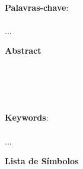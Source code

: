 \documentclass[a4paper, 12 pt]{article} %
\begin{document}
\blindtext 
%
\blindtext 
%
\blindtext 
%
\blindtext \\

\textbf{Palavras-chave}: \\ \\ ...

\clearpage


\begin{center}
    \large{\textbf{Abstract}}
\end{center}

\blindtext 
%
\blindtext 
%
\blindtext 
%
\blindtext \\
\\
\\
\\
\textbf{Keywords}:
\\
\\
...



\clearpage

\begin{center}
\listoffigures \newpage %
\end{center}

\begin{center}
\listoftables \newpage %
\end{center}

\begin{center}
    \large{\textbf{Lista de Símbolos}}
\end{center}

\vspace{0.5cm}
\end{document}
